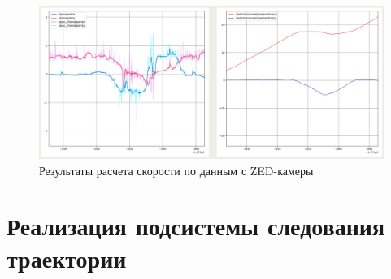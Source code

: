 \begin{figure}[h]
    \centering
    \includegraphics[width=\linewidth]{images/3_devel/zed_calc_speed}
    \caption{Результаты расчета скорости по данным с ZED-камеры}
    \label{img:zed_calc_speed}
\end{figure}

\section{Реализация подсистемы следования траектории}